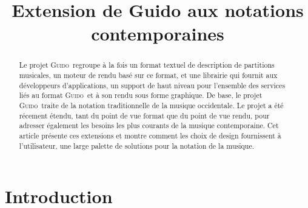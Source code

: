 \documentclass{article}
\title{\centering Extension de Guido aux notations contemporaines}
\newcommand{\guido}			{\textsc{Guido}}
\begin{document}

\maketitle

\begin{abstract}

Le projet \guido\ regroupe à la fois un format textuel de description de partitions musicales, un moteur de rendu basé sur ce format, et une librairie qui fournit aux développeurs d'applications, un support de haut niveau pour l'ensemble des services liés au format \guido\ et à son rendu sous forme graphique. 
De base, le projet \guido\ traite de la notation traditionnelle de la musique occidentale. Le projet a été récement étendu, tant du point de vue format que du point de vue rendu, pour adresser également les besoins les plus courants de la musique contemporaine. Cet article présente ces extensions et montre comment les choix de design fournissent à l'utilisateur, une large palette de solutions pour la notation de la musique. 


\end{abstract}


\section{Introduction}\label{sec:introduction}

% 
\end{document}
